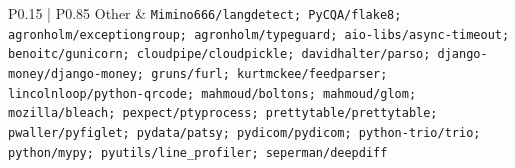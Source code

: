 \begin{table}[ht!]
{\begin{tabular}{P{0.15\textwidth} | P{0.85\textwidth}}
\midrule
Other & \footnotesize\texttt{Mimino666/langdetect; PyCQA/flake8; agronholm/exceptiongroup; agronholm/typeguard; aio-libs/async-timeout; benoitc/gunicorn; cloudpipe/cloudpickle; davidhalter/parso; django-money/django-money; gruns/furl; kurtmckee/feedparser; lincolnloop/python-qrcode; mahmoud/boltons; mahmoud/glom; mozilla/bleach; pexpect/ptyprocess; prettytable/prettytable; pwaller/pyfiglet; pydata/patsy; pydicom/pydicom; python-trio/trio; python/mypy; pyutils/line\_profiler; seperman/deepdiff} \\
\bottomrule
    \end{tabular}
    }
    \caption{License associated with each repository as of April 8, 2025. All licenses are permissive and allow for public, nonprofit use.}
    \label{tab:licenses}
\end{table}